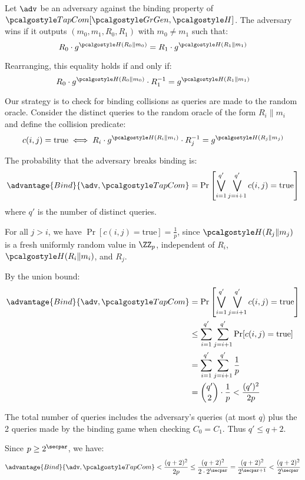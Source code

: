 \ifsolutions
\begin{mysolution}
  Let $\adv$ be an adversary against the binding property of $\algo{TapCom}[\grgen, \algo{H}]$. The adversary wins if it outputs $(m_0, m_1, R_0, R_1)$ with $m_0 \neq m_1$ such that:
  \[
  R_0 \cdot g^{\algo{H}(R_0 \| m_0)} = R_1 \cdot g^{\algo{H}(R_1 \| m_1)}
  \]

  Rearranging, this equality holds if and only if:
  \[
  R_0 \cdot g^{\algo{H}(R_0 \| m_0)} \cdot R_1^{-1} = g^{\algo{H}(R_1 \| m_1)}
  \]

  Our strategy is to check for binding collisions as queries are made to the random oracle.
  Consider the distinct queries to the random oracle of the form $R_i \| m_i$ and define the collision predicate:
  \[
  c(i, j) = \text{true} \iff R_i \cdot g^{\algo{H}(R_i \| m_i)} \cdot R_j^{-1} = g^{\algo{H}(R_j \| m_j)}
  \]
  
  The probability that the adversary breaks binding is:
  \[
  \advantage{Bind}{\adv, \algo{TapCom}} = \Pr\left[\bigvee_{i=1}^{q'} \bigvee_{j=i+1}^{q'} c(i,j) = \text{true}\right]
  \]
  where $q'$ is the number of distinct queries.
  
  For all $j > i$, we have $\Pr[c(i,j) = \text{true}] = \frac{1}{p}$, since $\algo{H}(R_j \| m_j)$ is a fresh uniformly random value in $\ZZ_p$, independent of $R_i$, $\algo{H}(R_i \| m_i)$, and $R_j$.
  
  By the union bound:
  \begin{align*}
    \advantage{Bind}{\adv, \algo{TapCom}} &= \Pr\left[\bigvee_{i=1}^{q'} \bigvee_{j=i+1}^{q'} c(i,j) = \text{true}\right] \\
    &\leq \sum_{i=1}^{q'} \sum_{j=i+1}^{q'} \Pr[c(i,j) = \text{true}] \\
    &= \sum_{i=1}^{q'} \sum_{j=i+1}^{q'} \frac{1}{p} \\
    &= \binom{q'}{2} \cdot \frac{1}{p} < \frac{(q')^2}{2p}
  \end{align*}
  
  The total number of queries includes the adversary's queries (at most $q$) plus the 2 queries made by the binding game when checking $C_0 = C_1$. Thus $q' \leq q + 2$.
  
  Since $p \geq 2^\secpar$, we have:
  \[
  \advantage{Bind}{\adv, \algo{TapCom}} < \frac{(q+2)^2}{2p} \leq \frac{(q+2)^2}{2 \cdot 2^\secpar} = \frac{(q+2)^2}{2^{\secpar+1}} < \frac{(q+2)^2}{2^\secpar}
  \]
\end{mysolution}
\fi

